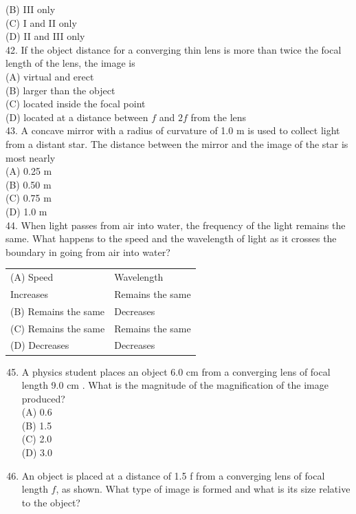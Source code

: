\begin{enumerate}
(B) III only\\
(C) I and II only\\
(D) II and III only\\
42. If the object distance for a converging thin lens is more than twice the focal length of the lens, the image is\\
(A) virtual and erect\\
(B) larger than the object\\
(C) located inside the focal point\\
(D) located at a distance between $f$ and $2 f$ from the lens\\
43. A concave mirror with a radius of curvature of 1.0 m is used to collect light from a distant star. The distance between the mirror and the image of the star is most nearly\\
(A) 0.25 m\\
(B) 0.50 m\\
(C) 0.75 m\\
(D) 1.0 m\\
44. When light passes from air into water, the frequency of the light remains the same. What happens to the speed and the wavelength of light as it crosses the boundary in going from air into water?

\begin{center}
\begin{tabular}{ll}
(A) Speed & Wavelength \\
Increases & Remains the same \\
(B) Remains the same & Decreases \\
(C) Remains the same & Remains the same \\
(D) Decreases & Decreases \\
\end{tabular}
\end{center}

\begin{enumerate}
  \setcounter{enumi}{44}
  \item A physics student places an object 6.0 cm from a converging lens of focal length 9.0 cm . What is the magnitude of the magnification of the image produced?\\
(A) 0.6\\
(B) 1.5\\
(C) 2.0\\
(D) 3.0
  \item An object is placed at a distance of 1.5 f from a converging lens of focal length $f$, as shown. What type of image is formed and what is its size relative to the object?
\end{enumerate}


\end{enumerate}
